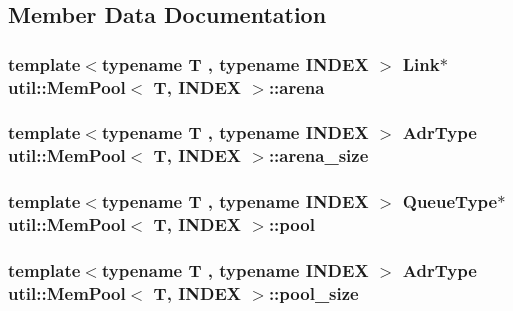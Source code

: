 \subsection{Member Data Documentation}
\hypertarget{structutil_1_1MemPool_ad57ae2b34c9a37bfe06c8e4f2391cc79}{
\subsubsection[{arena}]{\setlength{\rightskip}{0pt plus 5cm}template$<$typename T , typename I\-N\-D\-E\-X $>$ {\bf Link}$\ast$ {\bf util\-::\-Mem\-Pool}$<$ T, I\-N\-D\-E\-X $>$\-::arena}}\label{structutil_1_1MemPool_ad57ae2b34c9a37bfe06c8e4f2391cc79}
\hypertarget{structutil_1_1MemPool_aed11ede5c4c2ebe38250f8e994778ad0}{
\subsubsection[{arena\-\_\-size}]{\setlength{\rightskip}{0pt plus 5cm}template$<$typename T , typename I\-N\-D\-E\-X $>$ {\bf Adr\-Type} {\bf util\-::\-Mem\-Pool}$<$ T, I\-N\-D\-E\-X $>$\-::arena\-\_\-size}}\label{structutil_1_1MemPool_aed11ede5c4c2ebe38250f8e994778ad0}
\hypertarget{structutil_1_1MemPool_a16d1cdeb28025ec1efd62f495f6e24e7}{
\subsubsection[{pool}]{\setlength{\rightskip}{0pt plus 5cm}template$<$typename T , typename I\-N\-D\-E\-X $>$ {\bf Queue\-Type}$\ast$ {\bf util\-::\-Mem\-Pool}$<$ T, I\-N\-D\-E\-X $>$\-::pool}}\label{structutil_1_1MemPool_a16d1cdeb28025ec1efd62f495f6e24e7}
\hypertarget{structutil_1_1MemPool_a963a9317f3e7614a3929cae952235ad2}{
\subsubsection[{pool\-\_\-size}]{\setlength{\rightskip}{0pt plus 5cm}template$<$typename T , typename I\-N\-D\-E\-X $>$ {\bf Adr\-Type} {\bf util\-::\-Mem\-Pool}$<$ T, I\-N\-D\-E\-X $>$\-::pool\-\_\-size}}\label{structutil_1_1MemPool_a963a9317f3e7614a3929cae952235ad2}
